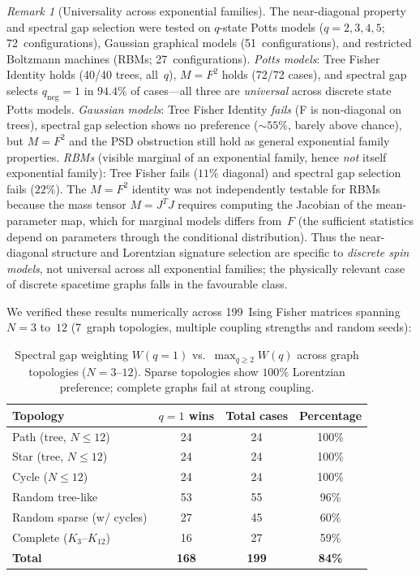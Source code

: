\documentclass[11pt]{article}
\theoremstyle{definition}
\theoremstyle{remark}
\newtheorem{remark}[theorem]{Remark}
\begin{document}
\begin{remark}[Universality across exponential families]
\label{rem:fisher-universality}
The near-diagonal property and spectral gap selection were tested
on $q$-state Potts models ($q = 2, 3, 4, 5$; 72~configurations),
Gaussian graphical models (51~configurations), and restricted
Boltzmann machines (RBMs; 27~configurations).
\emph{Potts models}: Tree Fisher Identity holds (40/40 trees, all~$q$),
$M = F^2$ holds (72/72 cases), and spectral gap selects $q_{\mathrm{neg}} = 1$
in $94.4\%$ of cases---all three are \emph{universal} across
discrete state Potts models.
\emph{Gaussian models}: Tree Fisher Identity \emph{fails}
(F is non-diagonal on trees), spectral gap selection shows no
preference (${\sim}55\%$, barely above chance), but $M = F^2$ and
the PSD obstruction still hold as general exponential family properties.
\emph{RBMs} (visible marginal of an exponential family, hence
\emph{not} itself exponential family): Tree Fisher fails ($11\%$
diagonal) and spectral gap selection fails ($22\%$).
The $M = F^2$ identity was not independently testable for RBMs
because the mass tensor $M = J^T J$ requires computing the Jacobian
of the mean-parameter map, which for marginal models differs from~$F$
(the sufficient statistics depend on parameters through the
conditional distribution).
Thus the near-diagonal structure and Lorentzian signature selection
are specific to \emph{discrete spin models}, not universal across
all exponential families; the physically relevant case of
discrete spacetime graphs falls in the favourable class.
\end{remark}

We verified these results numerically across 199~Ising Fisher matrices
spanning $N = 3$ to~$12$ (7~graph topologies, multiple coupling strengths
and random seeds):

\begin{table}[ht]
\centering
\caption{Spectral gap weighting $W(q=1)$ vs.\ $\max_{q \geq 2} W(q)$
across graph topologies ($N = 3$--$12$).
Sparse topologies show $100\%$ Lorentzian
preference; complete graphs fail at strong coupling.}
\label{tab:spectral-gap}
\begin{tabular}{@{}lccc@{}}
\toprule
Topology & $q = 1$ wins & Total cases & Percentage \\
\midrule
Path (tree, $N \leq 12$)    & 24 & 24 & 100\% \\
Star (tree, $N \leq 12$)    & 24 & 24 & 100\% \\
Cycle ($N \leq 12$)         & 24 & 24 & 100\% \\
Random tree-like             & 53 & 55 & 96\% \\
Random sparse (w/ cycles)    & 27 & 45 & 60\% \\
Complete ($K_3$--$K_{12}$)  & 16 & 27 & 59\% \\
\midrule
\textbf{Total} & \textbf{168} & \textbf{199} & \textbf{84\%} \\
\bottomrule
\end{tabular}
\end{table}
\end{document}
